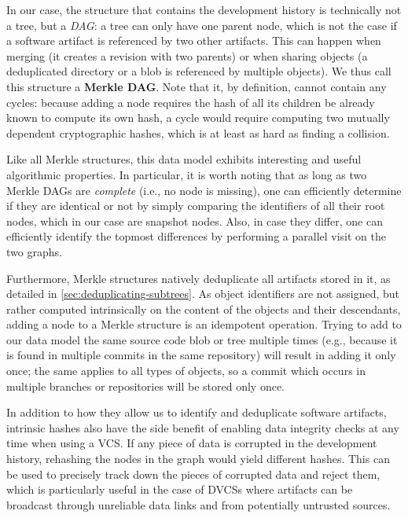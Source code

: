 In our case, the structure that contains the development history is technically
not a tree, but a \emph{\gls{DAG}}: a tree can only have one parent node, which
is not the case if a software artifact is referenced by two other artifacts.
This can happen when merging (it creates a revision with two parents) or when
sharing objects (a deduplicated directory or a blob is referenced by
multiple objects). We thus call this structure a \textbf{Merkle DAG}. Note that
it, by definition, cannot contain any cycles: because adding a node requires
the hash of all its children be already known to compute its own hash, a cycle
would require computing two mutually dependent cryptographic hashes, which is
at least as hard as finding a collision.

Like all Merkle structures, this data model exhibits interesting and useful
algorithmic properties. In particular, it is worth noting that as long as two
Merkle DAGs are \emph{complete} (i.e., no node is missing), one can efficiently
determine if they are identical or not by simply comparing the identifiers of
all their root nodes, which in our case are snapshot nodes. Also, in case they
differ, one can efficiently identify the topmost differences by performing a
parallel visit on the two graphs.

Furthermore, Merkle structures natively deduplicate all artifacts stored in it,
as detailed in \cref{sec:deduplicating-subtrees}.  As object identifiers are
not assigned, but rather computed intrinsically on the content of the objects
and their descendants, adding a node to a Merkle structure is an idempotent
operation. Trying to add to our data model the same source code blob or tree
multiple times (e.g., because it is found in multiple commits in the same
repository) will result in adding it only once; the same applies to all types
of objects, so a commit which occurs in multiple branches or repositories
will be stored only once.

In addition to how they allow us to identify and deduplicate software
artifacts, intrinsic hashes also have the side benefit of enabling data
integrity checks at any time when using a \gls{VCS}. If any piece of data is
corrupted in the development history, rehashing the nodes in the graph would
yield different hashes. This can be used to precisely track down the pieces of
corrupted data and reject them, which is particularly useful in the case of
\glspl{DVCS} where artifacts can be broadcast through unreliable data links and
from potentially untrusted sources.

